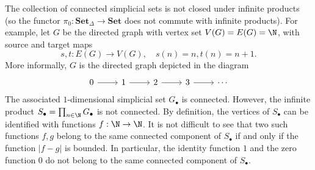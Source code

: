 \begin{example}
The collection of connected simplicial sets is not closed under infinite products (so the functor $\pi_0:\mathbf{Set}_\Delta\to\mathbf{Set}$ does not commute with infinite products). For example, let $G$ be the directed graph with vertex set $V(G)=E(G)=\N$, with source and target maps
\[s,t:E(G)\to V(G),\quad s(n)=n,t(n)=n+1.\]
More informally, $G$ is the directed graph depicted in the diagram
\[\begin{tikzcd}
0\ar[r]&1\ar[r]&2\ar[r]&3\ar[r]&\cdots
\end{tikzcd}\]
The associated $1$-dimensional simplicial set $G_\bullet$ is connected. However, the infinite product $S_\bullet=\prod_{n\in\N}G_\bullet$ is not connected. By definition, the vertices of $S_\bullet$ can be identified with functions $f:\N\to\N$. It is not difficult to see that two such functions $f,g$ belong to the same connected component of $S_\bullet$ if and only if the function $|f-g|$ is bounded. In particular, the identity function $1$ and the zero function $0$ do not belong to the same connected component of $S_\bullet$.
\end{example}
